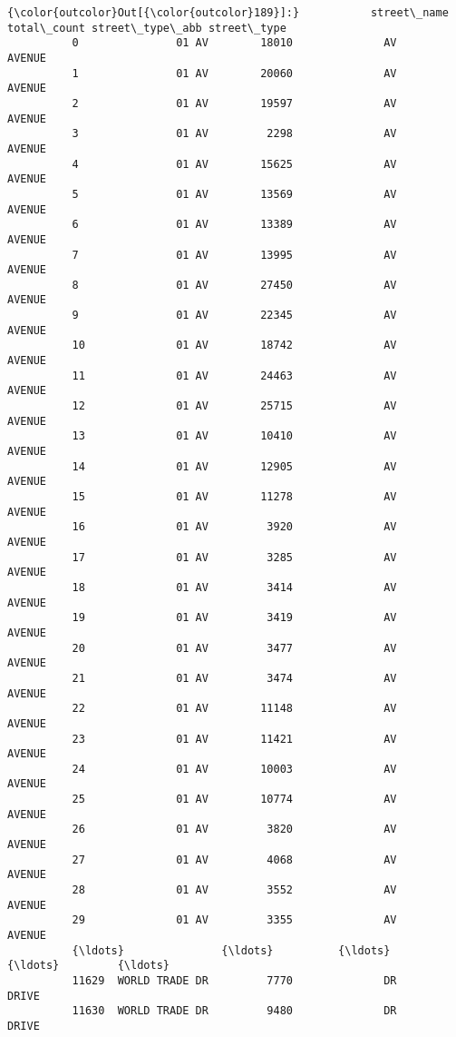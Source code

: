 \documentclass[11pt]{article}
\begin{document}
\begin{Verbatim}[commandchars=\\\{\}]
{\color{outcolor}Out[{\color{outcolor}189}]:}           street\_name  total\_count street\_type\_abb street\_type
          0               01 AV        18010              AV      AVENUE
          1               01 AV        20060              AV      AVENUE
          2               01 AV        19597              AV      AVENUE
          3               01 AV         2298              AV      AVENUE
          4               01 AV        15625              AV      AVENUE
          5               01 AV        13569              AV      AVENUE
          6               01 AV        13389              AV      AVENUE
          7               01 AV        13995              AV      AVENUE
          8               01 AV        27450              AV      AVENUE
          9               01 AV        22345              AV      AVENUE
          10              01 AV        18742              AV      AVENUE
          11              01 AV        24463              AV      AVENUE
          12              01 AV        25715              AV      AVENUE
          13              01 AV        10410              AV      AVENUE
          14              01 AV        12905              AV      AVENUE
          15              01 AV        11278              AV      AVENUE
          16              01 AV         3920              AV      AVENUE
          17              01 AV         3285              AV      AVENUE
          18              01 AV         3414              AV      AVENUE
          19              01 AV         3419              AV      AVENUE
          20              01 AV         3477              AV      AVENUE
          21              01 AV         3474              AV      AVENUE
          22              01 AV        11148              AV      AVENUE
          23              01 AV        11421              AV      AVENUE
          24              01 AV        10003              AV      AVENUE
          25              01 AV        10774              AV      AVENUE
          26              01 AV         3820              AV      AVENUE
          27              01 AV         4068              AV      AVENUE
          28              01 AV         3552              AV      AVENUE
          29              01 AV         3355              AV      AVENUE
          {\ldots}               {\ldots}          {\ldots}             {\ldots}         {\ldots}
          11629  WORLD TRADE DR         7770              DR       DRIVE
          11630  WORLD TRADE DR         9480              DR       DRIVE

\end{Verbatim}
\end{document}
